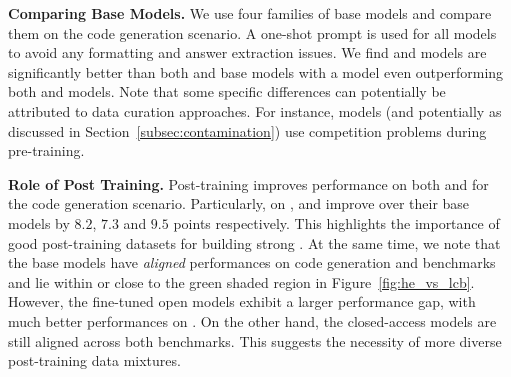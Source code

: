 \noindent \textbf{Comparing Base Models.}
We use four families of base models and compare them on the code generation scenario.
A one-shot prompt is used for all models to avoid any formatting and answer extraction issues.
We find \llamabase{} and \deepseekcode{} models are significantly better than both \cllama{} and \starcodertwo{} base models with 
a  model even outperforming both  and  models.
Note that some \lcb{} specific differences can potentially be attributed to data curation approaches.
For instance,  models (and potentially  as discussed in Section~\ref{subsec:contamination}) use competition problems during pre-training.%


\noindent \textbf{Role of Post Training.}
Post-training improves performance on both \humanevalplus{} and \livecodebench{} for the code generation scenario.
Particularly, on \lcb{} ,  and \phind{} improve  over their base models by $8.2$, $7.3$ and $9.5$ points respectively.
This highlights the importance of good post-training datasets  for building strong \llms{}. 
At the same time, we note that the base models have \textit{aligned} performances on \lcb{} code generation and \humanevalplus{} benchmarks and lie within or close to the green shaded region in Figure~\ref{fig:he_vs_lcb}.
However, the fine-tuned open models exhibit a larger performance gap, with much better performances on \humanevalplus{}.
On the other hand, the closed-access models are still aligned across both benchmarks.
This suggests the necessity of more diverse post-training data mixtures. 


